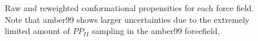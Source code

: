 \documentclass[journal=jacsat,manuscript=article]{achemso}
\begin{document}
\begin{figure}

\caption{
Raw and reweighted conformational propensities for each force field.  Note that amber99 shows larger uncertainties due to the extremely limited amount of $PP_{II}$ sampling in the amber99 forcefield.
}
\label{figure:ALA3}
\end{figure}
\end{document}
